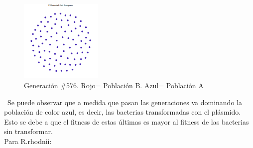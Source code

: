 \documentclass[12pt]{article}
\numberwithin{equation}{section}
\begin{document}
\begin{figure}[!ht]
\includegraphics[width=0.35\textwidth]{ecoli_moran_576.png}
\caption{Generación $\#$576. Rojo= Población B. Azul= Población A }
\FloatBarrier
\end{figure}
\FloatBarrier
\ Se puede observar que a medida que pasan las generaciones va dominando la población de color azul, es decir, las bacterias transformadas con el plásmido. Esto se debe a que el fitness de estas últimas es mayor al fitness de las bacterias sin transformar.\\

Para R.rhodnii:\\
\end{document}

